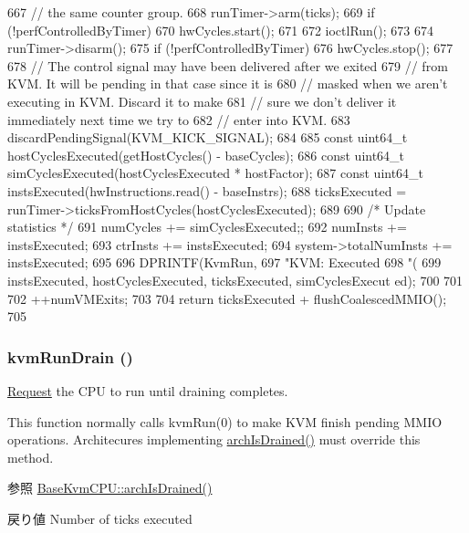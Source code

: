 \begin{DoxyCode}
{{667         // the same counter group.
668         runTimer->arm(ticks);
669         if (!perfControlledByTimer)
670             hwCycles.start();
671 
672         ioctlRun();
673 
674         runTimer->disarm();
675         if (!perfControlledByTimer)
676             hwCycles.stop();
677 
678         // The control signal may have been delivered after we exited
679         // from KVM. It will be pending in that case since it is
680         // masked when we aren't executing in KVM. Discard it to make
681         // sure we don't deliver it immediately next time we try to
682         // enter into KVM.
683         discardPendingSignal(KVM_KICK_SIGNAL);
684 
685         const uint64_t hostCyclesExecuted(getHostCycles() - baseCycles);
686         const uint64_t simCyclesExecuted(hostCyclesExecuted * hostFactor);
687         const uint64_t instsExecuted(hwInstructions.read() - baseInstrs);
688         ticksExecuted = runTimer->ticksFromHostCycles(hostCyclesExecuted);
689 
690         /* Update statistics */
691         numCycles += simCyclesExecuted;;
692         numInsts += instsExecuted;
693         ctrInsts += instsExecuted;
694         system->totalNumInsts += instsExecuted;
695 
696         DPRINTF(KvmRun,
697                 "KVM: Executed %
698                 "(%
699                 instsExecuted, hostCyclesExecuted, ticksExecuted, simCyclesExecut
      ed);
700     }
701 
702     ++numVMExits;
703 
704     return ticksExecuted + flushCoalescedMMIO();
705 }
\end{DoxyCode}
\hypertarget{classBaseKvmCPU_a405afc17ad0dee3b816012ce909b2b6f}{
\subsubsection[{kvmRunDrain}]{ kvmRunDrain ()}}
\label{classBaseKvmCPU_a405afc17ad0dee3b816012ce909b2b6f}
\hyperlink{classRequest}{Request} the CPU to run until draining completes.

This function normally calls kvmRun(0) to make KVM finish pending MMIO operations. Architecures implementing \hyperlink{classBaseKvmCPU_a4ee4cbdc5d3315fd8016b44d3e77abd5}{archIsDrained()} must override this method.

\begin{DoxySeeAlso}{参照}
\hyperlink{classBaseKvmCPU_a4ee4cbdc5d3315fd8016b44d3e77abd5}{BaseKvmCPU::archIsDrained()}
\end{DoxySeeAlso}
\begin{DoxyReturn}{戻り値}
Number of ticks executed 
\end{DoxyReturn}


